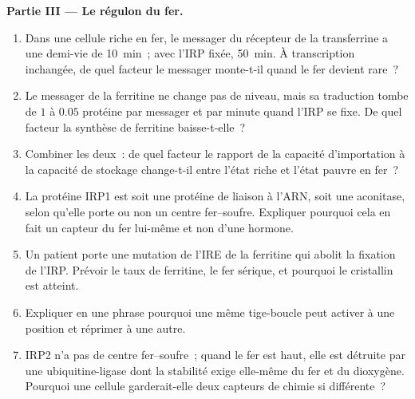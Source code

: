 \begin{problem}
\medskip
\noindent\textbf{Partie III --- Le régulon du fer.}
\begin{enumerate}[resume]
  \item Dans une cellule riche en fer, le messager du récepteur de la
        transferrine a une demi-vie de \qty{10}{min}~; avec l'IRP
        fixée, \qty{50}{min}. À transcription inchangée, de quel
        facteur le messager monte-t-il quand le fer devient rare~?
  \item Le messager de la ferritine ne change pas de niveau, mais sa
        traduction tombe de $1$ à $0.05$ protéine par messager et par
        minute quand l'IRP se fixe. De quel facteur la synthèse de
        ferritine baisse-t-elle~?
  \item Combiner les deux~: de quel facteur le rapport de la capacité
        d'importation à la capacité de stockage change-t-il entre
        l'état riche et l'état pauvre en fer~?
  \item La protéine IRP1 est soit une protéine de liaison à l'ARN, soit
        une aconitase, selon qu'elle porte ou non un centre
        fer--soufre. Expliquer pourquoi cela en fait un capteur du fer
        lui-même et non d'une hormone.
  \item Un patient porte une mutation de l'IRE de la ferritine qui
        abolit la fixation de l'IRP. Prévoir le taux de ferritine, le
        fer sérique, et pourquoi le cristallin est atteint.
  \item Expliquer en une phrase pourquoi une même tige-boucle peut
        activer à une position et réprimer à une autre.
  \item IRP2 n'a pas de centre fer--soufre~; quand le fer est haut,
        elle est détruite par une ubiquitine-ligase dont la stabilité
        exige elle-même du fer et du dioxygène. Pourquoi une cellule
        garderait-elle deux capteurs de chimie si différente~?
\end{enumerate}


\end{problem}
